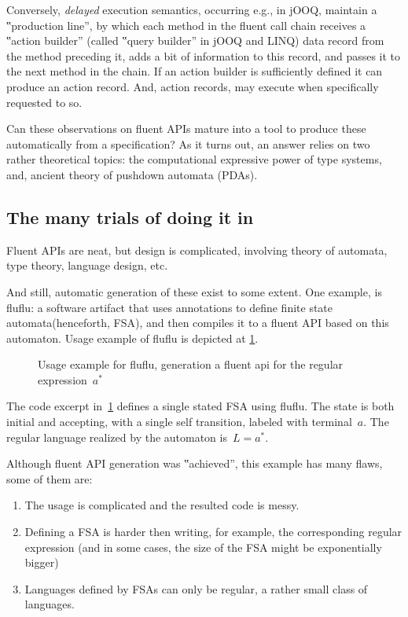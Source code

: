 Conversely, \emph{delayed} execution semantics, occurring e.g., in jOOQ,
  maintain a ‟production line”,
  by which each method in the fluent call chain receives a
  ‟action builder” (called ‟query builder” in jOOQ and LINQ)
  data record from the method preceding it, adds a bit of
  information to this record, and passes it to the next method
  in the chain.
If an action builder is sufficiently defined it can
  produce an action record.
And, action records, may execute
  when specifically requested to so.

Can these observations on fluent APIs mature into
  a tool to produce these automatically from a specification?
As it turns out, an answer relies on
  two rather theoretical topics:
  the computational expressive power of type systems,
  and, ancient theory of pushdown automata (PDAs).

\subsection{The many trials of doing it in \Java}
Fluent APIs are neat, but design is complicated,
involving theory of automata, type theory, language design, etc.

And still, automatic generation of these exist to some extent.
One example, is fluflu: a software artifact that uses
\Java annotations to define finite state automata(henceforth, FSA), and then
compiles it to a fluent API based on this automaton. Usage example of fluflu is
depicted at \cref{figure:fluflu}.

\begin{figure}[ht]
  \caption{\label{figure:fluflu}
    Usage example for fluflu, generation a fluent
    api for the regular expression~$a^*$}
\end{figure}
The code excerpt in~\cref{figure:fluflu} defines a single stated FSA using
fluflu. The state is both initial and accepting, with a single self
transition, labeled with terminal~$a$. The regular language realized by the
automaton is~$L=a^*$.

Although fluent API generation was ‟achieved”, this example has many flaws, some of them are:

\begin{enumerate}
  \item The usage is complicated and the resulted code is messy.
  \item Defining a FSA is harder then writing, for example, the corresponding regular
    expression (and in some cases, the size of the FSA might be exponentially bigger)
  \item Languages defined by FSAs can only be regular, a rather small
    class of languages.
\end{enumerate}

